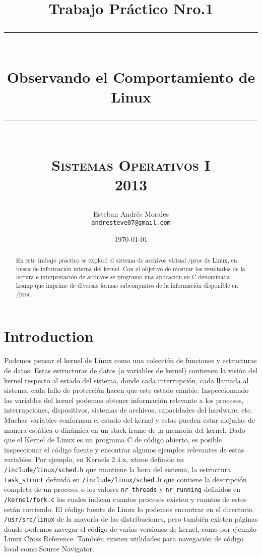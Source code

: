 \documentclass{article}
\newcommand{\HRule}{\rule{\linewidth}{0.5mm}} %
\begin{document}
\title{Trabajo Práctico Nro.1\\
		\HRule \\[0.4cm]		
		{\huge \bfseries{Observando el Comportamiento de Linux}}\\[0.4cm]
		\HRule \\[1.5cm]
		\textsc{ Sistemas Operativos I}\\
		\textsc{2013}
		} %
\author{Esteban Andrés Morales\\
		\texttt{\small andresteve07@gmail.com}
		}  %
\date{\today}  %
\maketitle

\begin{abstract}  
En este trabajo práctico se exploró el sistema de archivos virtual /proc de Linux, en busca de información interna del kernel. Con el objetivo de mostrar los resultados de la lectura e interpretación de archivos se programó una aplicación en C denominada ksamp que imprime de diversas formas subconjuntos de la información disponible en /proc. 

\end{abstract}

\section{Introduction}
Podemos pensar el kernel de Linux como una colección de funciones y estructuras de datos. Estas estructuras de datos (o variables de kernel) contienen la visión del kernel respecto al estado del sistema, donde cada interrupción, cada llamada al sistema, cada fallo de protección hacen que este estado cambie. 
Inspeccionando las variables del kernel podemos obtener información relevante a los procesos, interrupciones, dispositivos, sistemas de archivos, capacidades del hardware, etc.
Muchas variables conforman el estado del kernel y estas pueden estar alojadas de manera estática o dinámica en un stack frame de la memoria del kernel.
Dado que el Kernel de Linux es un programa C de código abierto, es posible inspeccionar el código fuente y encontrar algunos ejemplos relevantes de estas variables.
Por ejemplo, en Kernels 2.4.x, xtime definido en \verb+/include/linux/sched.h+ que mantiene la hora del sistema, la estructura \verb+task_struct+ definida en \verb+/include/linux/sched.h+ que contiene la descripción completa de un proceso, o los valores \verb+nr_threads+ y \verb+nr_running+ definidos en \verb+/kernel/fork.c+ los cuales indican cuantos procesos existen y cuantos de estos están corriendo.
El código fuente de Linux lo podemos encontrar en el directorio \verb+/usr/src/linux+ de la mayoría de las distribuciones, pero también existen páginas donde podemos navegar el código de varias versiones de kernel, como por ejemplo  Linux Cross Reference. También existen utilidades para navegación de código local como Source Navigator.
\end{document}
